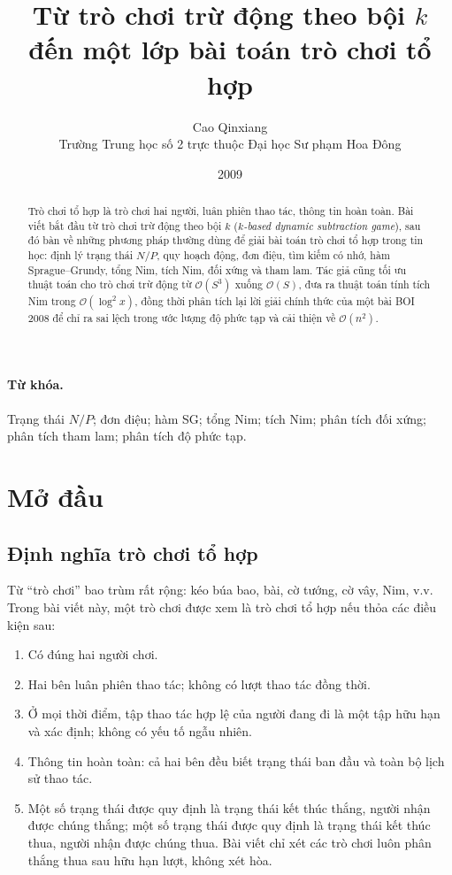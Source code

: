 \documentclass[11pt]{article}
\title{Từ trò chơi trừ động theo bội \(k\) đến một lớp bài toán trò chơi tổ hợp}
\author{Cao Qinxiang\\Trường Trung học số 2 trực thuộc Đại học Sư phạm Hoa Đông}
\date{2009}
\newcommand{\Oh}{\mathcal{O}}
\begin{document}
\maketitle


\begin{abstract}
Trò chơi tổ hợp là trò chơi hai người, luân phiên thao tác, thông tin hoàn
toàn. Bài viết bắt đầu từ trò chơi trừ động theo bội \(k\)
(\emph{\(k\)-based dynamic subtraction game}), sau đó bàn về những phương pháp
thường dùng để giải bài toán trò chơi tổ hợp trong tin học: định lý trạng thái
\(N/P\), quy hoạch động, đơn điệu, tìm kiếm có nhớ, hàm Sprague--Grundy, tổng
Nim, tích Nim, đối xứng và tham lam. Tác giả cũng tối ưu thuật toán cho trò
chơi trừ động từ \(\Oh(S^3)\) xuống \(\Oh(S)\), đưa ra thuật toán tính tích Nim
trong \(\Oh(\log^2 x)\), đồng thời phân tích lại lời giải chính thức của một
bài BOI 2008 để chỉ ra sai lệch trong ước lượng độ phức tạp và cải thiện về
\(\Oh(n^2)\).
\end{abstract}

\paragraph{Từ khóa.}
Trạng thái \(N/P\); đơn điệu; hàm SG; tổng Nim; tích Nim; phân tích đối xứng;
phân tích tham lam; phân tích độ phức tạp.

\section{Mở đầu}

\subsection{Định nghĩa trò chơi tổ hợp}

Từ ``trò chơi'' bao trùm rất rộng: kéo búa bao, bài, cờ tướng, cờ vây, Nim,
v.v. Trong bài viết này, một trò chơi được xem là trò chơi tổ hợp nếu thỏa
các điều kiện sau:
\begin{enumerate}
  \item Có đúng hai người chơi.
  \item Hai bên luân phiên thao tác; không có lượt thao tác đồng thời.
  \item Ở mọi thời điểm, tập thao tác hợp lệ của người đang đi là một tập hữu
  hạn và xác định; không có yếu tố ngẫu nhiên.
  \item Thông tin hoàn toàn: cả hai bên đều biết trạng thái ban đầu và toàn bộ
  lịch sử thao tác.
  \item Một số trạng thái được quy định là trạng thái kết thúc thắng, người
  nhận được chúng thắng; một số trạng thái được quy định là trạng thái kết
  thúc thua, người nhận được chúng thua. Bài viết chỉ xét các trò chơi luôn
  phân thắng thua sau hữu hạn lượt, không xét hòa.
\end{enumerate}
\end{document}
